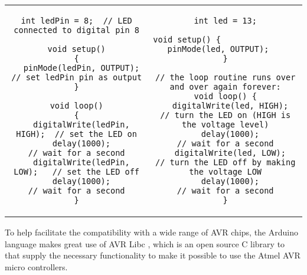 \begin{tabular}{c | c}
\begin{lstlisting}
int ledPin = 8;  // LED connected to digital pin 8

void setup()
{
  pinMode(ledPin, OUTPUT);  // set ledPin pin as output
}

void loop()
{
  digitalWrite(ledPin, HIGH);  // set the LED on
  delay(1000);                 // wait for a second
  digitalWrite(ledPin, LOW);   // set the LED off
  delay(1000);                 // wait for a second
}
\end{lstlisting}
&
\begin{lstlisting}
int led = 13;

void setup() {                
  pinMode(led, OUTPUT);     
}

// the loop routine runs over and over again forever:
void loop() {
  digitalWrite(led, HIGH);   // turn the LED on (HIGH is the voltage level)
  delay(1000);               // wait for a second
  digitalWrite(led, LOW);    // turn the LED off by making the voltage LOW
  delay(1000);               // wait for a second
}
\end{lstlisting}
\end{tabular}
To help facilitate the compatibility with a wide range of AVR chips, the Arduino language makes great use of AVR Libc \cite{AVR:lib}, which is an open source C library to that supply the necessary functionality to make it possible to use the Atmel AVR micro controllers.